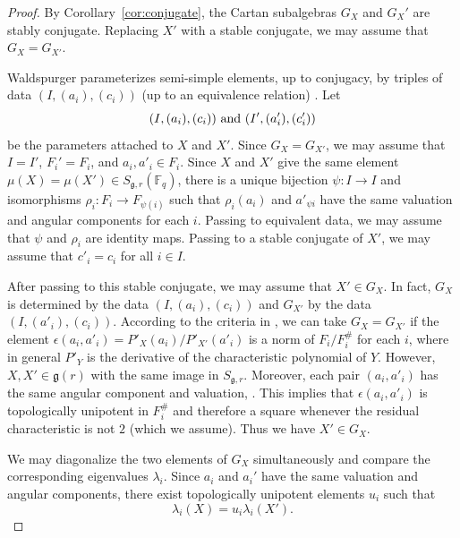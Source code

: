 \documentclass[11pt]{amsart}
\theoremstyle{definition}
\theoremstyle{remark}
\numberwithin{equation}{theorem}
\def\f{{\mathbb{F}_q}}
\def\lie#1{{\mathfrak{#1}}}
\def\lb{\text{\#}}
\begin{document}
\begin{proof}
By Corollary~\ref{cor:conjugate}, the Cartan subalgebras $G_X$ and
$G_X'$ are stably conjugate. Replacing $X'$ with a stable
conjugate, we may assume that $G_X = G_{X'}$.

Waldspurger parameterizes semi-simple elements, up to conjugacy,
by triples of data $(I,(a_i),(c_i))$ (up to an equivalence
relation) \cite{WA}.   Let
    $$
    (I,(a_i),(c_i)) \hbox{ and } (I',(a'_i),(c'_i))
    $$
be the parameters attached to $X$ and $X'$. Since $G_X = G_{X'}$,
we may assume that $I=I'$, $F_i' = F_i$, and $a_i,a'_i\in F_i$.
Since $X$ and $X'$ give the same element $\mu(X)=\mu(X')\in
S_{\lie{g},r}(\f)$, there is a unique bijection $\psi:I\to I$ and
isomorphisms $\rho_i:F_i\to F_{\psi(i)}$ such that $\rho_i(a_i)$
and $a'_{\psi i}$ have the same valuation and angular components
for each $i$. Passing to equivalent data, we may assume that
$\psi$ and $\rho_i$ are identity maps. Passing to a stable
conjugate of $X'$, we may assume that $c'_i=c_i$ for all $i\in I$.

After passing to this stable conjugate, we may assume that $X'\in
G_X$.  In fact, $G_X$ is determined by the data $(I,(a_i),(c_i))$
and $G_{X'}$ by the data $(I,(a'_i),(c_i))$.  According to the
criteria in \cite{WA}, we can take $G_X = G_{X'}$ if the element
$\epsilon(a_i,a'_i)=P'_X(a_i)/P'_{X'}(a'_i)$ is a norm of
$F_i/F_i^\lb$ for each $i$, where in general $P'_Y$ is the
derivative of the characteristic polynomial of $Y$.  However,
$X,X'\in\lie{g}(r)$ with the same image in $S_{\lie{g},r}$.
Moreover, each pair $(a_i,a'_i)$ has the same angular component
and valuation, . This implies that $\epsilon(a_i,a'_i)$ is
topologically unipotent in $F_i^\lb$ and therefore a square
whenever the residual characteristic is not $2$ (which we assume).
Thus we have $X'\in G_X$.

We may diagonalize the two elements of $G_X$ simultaneously and
compare the corresponding eigenvalues $\lambda_i$.  Since $a_i$
and $a_i'$ have the same valuation and angular components, there
exist topologically unipotent elements $u_i$ such that
    \begin{equation}\lambda_i(X) = u_i \lambda_i(X').\end{equation}


\end{proof}
\end{document}
